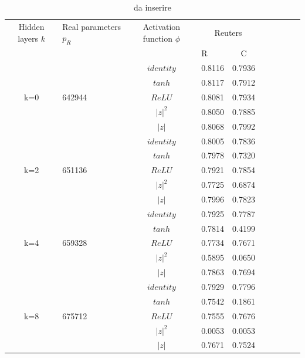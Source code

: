 \documentclass[a4paper,10pt]{article}
\begin{document}
 \begin{table}
  \centering
  \begin{tabular}{cp{} cp{}   cp{} cp{} cp{}}
   \cline{1-5}
   Hidden layers $k$ & Real parameters $p_R$ & Activation function $\phi$ & \multicolumn{2}{c}{Reuters}\\
   \cline{4-5}
   & & & R & C \\
   \cline{1-5}
   & & $identity$ & 0.8116 & 0.7936 \\
   \cline{3-5}
   & & $tanh$ & 0.8117 & 0.7912 \\
   \cline{3-5}
   k=0 & 642944 & $ReLU$ & 0.8081 & 0.7934 \\
   \cline{3-5}
   & & $|z|^2$ & 0.8050 & 0.7885 \\
   \cline{3-5}
   & & $|z|$ & 0.8068 & 0.7992 \\
   \cline{1-5}
  
   & & $identity$ & 0.8005 & 0.7836 \\
   \cline{3-5}
   & & $tanh$ & 0.7978 & 0.7320 \\
   \cline{3-5}
   k=2 & 651136 & $ReLU$ & 0.7921 & 0.7854 \\
   \cline{3-5}
   & & $|z|^2$ & 0.7725 & 0.6874 \\
   \cline{3-5}
   & & $|z|$ & 0.7996 & 0.7823 \\
   \cline{1-5}
  
   & & $identity$ & 0.7925 & 0.7787 \\
   \cline{3-5}
   & & $tanh$ & 0.7814 & 0.4199 \\
   \cline{3-5}
   k=4 & 659328 & $ReLU$ & 0.7734 & 0.7671 \\
   \cline{3-5}
   & & $|z|^2$ & 0.5895 & 0.0650 \\
   \cline{3-5}
   & & $|z|$ & 0.7863 & 0.7694 \\
   \cline{1-5}
   
   & & $identity$ & 0.7929 & 0.7796 \\
   \cline{3-5}
   & & $tanh$ & 0.7542 & 0.1861 \\
   \cline{3-5}
   k=8 & 675712 & $ReLU$ & 0.7555 & 0.7676 \\
   \cline{3-5}
   & & $|z|^2$ & 0.0053 & 0.0053 \\
   \cline{3-5}
   & & $|z|$ & 0.7671 & 0.7524 \\
   \cline{1-5}
  \end{tabular}
  \caption{da inserire}
  \label{Reuters1Tab}
 \end{table}
 
\end{document}
